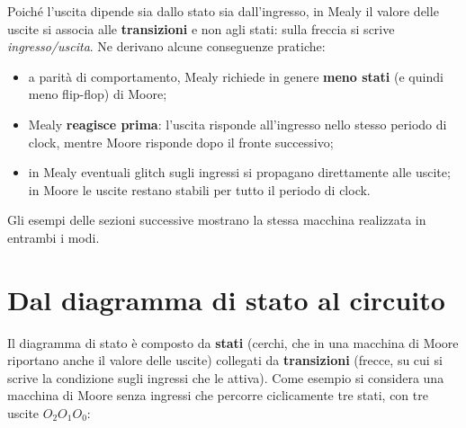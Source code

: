 \noindent Poiché l'uscita dipende sia dallo stato sia dall'ingresso, in Mealy il valore
delle uscite si associa alle \textbf{transizioni} e non agli stati: sulla freccia si scrive
\emph{ingresso/uscita}. Ne derivano alcune conseguenze pratiche:
\begin{itemize}[leftmargin=1.5em, itemsep=2pt]
    \item a parità di comportamento, Mealy richiede in genere \textbf{meno stati} (e quindi
          meno flip-flop) di Moore;
    \item Mealy \textbf{reagisce prima}: l'uscita risponde all'ingresso nello stesso periodo
          di clock, mentre Moore risponde dopo il fronte successivo;
    \item in Mealy eventuali glitch sugli ingressi si propagano direttamente alle uscite;
          in Moore le uscite restano stabili per tutto il periodo di clock.
\end{itemize}
Gli esempi delle sezioni successive mostrano la stessa macchina realizzata in entrambi i modi.

\section{Dal diagramma di stato al circuito}

Il diagramma di stato è composto da \textbf{stati} (cerchi, che in una macchina di Moore
riportano anche il valore delle uscite) collegati da \textbf{transizioni} (frecce, su cui si
scrive la condizione sugli ingressi che le attiva). Come esempio si considera una macchina
di Moore senza ingressi che percorre ciclicamente tre stati, con tre uscite $O_2O_1O_0$:

\begin{center}
\end{center}

